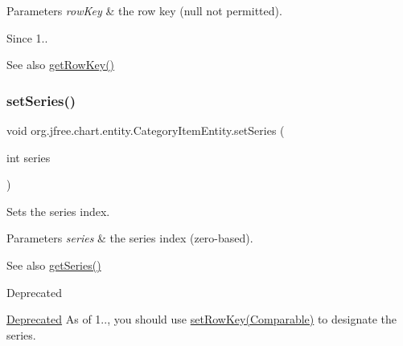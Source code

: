 \begin{DoxyParams}{Parameters}
{\em row\+Key} & the row key ({\ttfamily null} not permitted).\\
\hline
\end{DoxyParams}
\begin{DoxySince}{Since}
1..
\end{DoxySince}
\begin{DoxySeeAlso}{See also}
\mbox{\hyperlink{classorg_1_1jfree_1_1chart_1_1entity_1_1_category_item_entity_a8d21cdafb1a07e935df8df6d20369814}{get\+Row\+Key()}} 
\end{DoxySeeAlso}
\mbox{\label{classorg_1_1jfree_1_1chart_1_1entity_1_1_category_item_entity_a914cb3b56be73223fa862fe797ab73df}} 
\subsubsection{\texorpdfstring{set\+Series()}{setSeries()}}
{\footnotesize\ttfamily void org.\+jfree.\+chart.\+entity.\+Category\+Item\+Entity.\+set\+Series (\begin{DoxyParamCaption}\item[{int}]{series }\end{DoxyParamCaption})}

Sets the series index.


\begin{DoxyParams}{Parameters}
{\em series} & the series index (zero-\/based).\\
\hline
\end{DoxyParams}
\begin{DoxySeeAlso}{See also}
\mbox{\hyperlink{classorg_1_1jfree_1_1chart_1_1entity_1_1_category_item_entity_ad27d6ea7114f0775b0339acc79ce9d56}{get\+Series()}}
\end{DoxySeeAlso}
\begin{DoxyRefDesc}{Deprecated}
\item[\mbox{\hyperlink{deprecated__deprecated000042}{Deprecated}}]As of 1.., you should use \mbox{\hyperlink{classorg_1_1jfree_1_1chart_1_1entity_1_1_category_item_entity_ab9e5d63db61fe4152a86acc4de0d5b72}{set\+Row\+Key(\+Comparable)}} to designate the series. \end{DoxyRefDesc}
\mbox{\label{classorg_1_1jfree_1_1chart_1_1entity_1_1_category_item_entity_a085df739407e34a5fa1008ea12251bdf}} 
